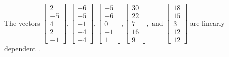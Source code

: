 \begin{exercise}
\begin{exerciseStatement}
  \end{exerciseStatement}
  \begin{exerciseAnswer}
   The vectors \(\left[\begin{array}{r}
2 \\
-5 \\
4 \\
2 \\
-1
\end{array}\right] , \left[\begin{array}{r}
-6 \\
-5 \\
-1 \\
-4 \\
-4
\end{array}\right] , \left[\begin{array}{r}
-5 \\
-6 \\
0 \\
-1 \\
1
\end{array}\right] , \left[\begin{array}{r}
30 \\
22 \\
7 \\
16 \\
9
\end{array}\right] , \text{ and } \left[\begin{array}{r}
18 \\
15 \\
3 \\
12 \\
12
\end{array}\right]\) are 
  	 linearly dependent  .
  


  \end{exerciseAnswer}
\end{exercise}